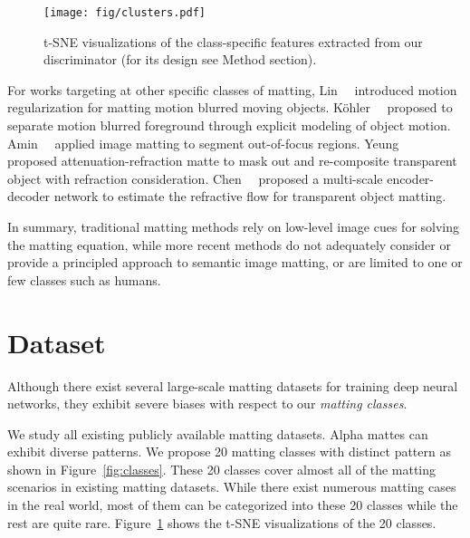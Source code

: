 \documentclass[10pt,twocolumn,letterpaper]{article}
\begin{document}
\begin{figure}[t]
\centering 
\texttt{[image: fig/clusters.pdf]} 
\caption{t-SNE visualizations of the class-specific features extracted from our discriminator (for its design see Method section).}
\label{fig:cluster}
\vspace{-12pt}
\end{figure}

\vspace{0.1in}

\vspace{2pt}
For works  targeting at other specific classes of matting, Lin~\etal~\cite{lin2011motion} introduced motion regularization for matting  motion blurred moving objects. Köhler~\etal~\cite{kohler2013improving} proposed to separate motion blurred foreground through explicit modeling of object motion. Amin~\etal~\cite{amin2019hybrid} applied image matting to segment out-of-focus regions. Yeung~\etal~\cite{yeung2011tog} proposed attenuation-refraction matte to mask out and re-composite transparent object with refraction consideration. Chen~\etal~\cite{chen2018tomnet} proposed a multi-scale encoder-decoder network to estimate the refractive flow for transparent object matting.


In summary, traditional matting methods rely on low-level image cues for solving the matting equation, while more recent methods do not adequately consider or provide a principled approach to semantic image matting, or are limited to one or few classes such as humans.


\section{Dataset}
Although there exist several large-scale matting datasets for training deep neural networks,  they exhibit severe biases with respect to our {\em matting classes}.


\vspace{4pt}
 We study all existing publicly available matting datasets. Alpha mattes can exhibit diverse patterns. We propose 20 matting classes with distinct pattern as shown in Figure~\ref{fig:classes}.
These 20 classes cover almost all of the matting scenarios  in existing matting datasets. While there exist numerous matting cases in the real world, most of them can be categorized into these 20 classes while the rest are quite rare.
Figure~\ref{fig:cluster} shows the t-SNE visualizations of the 20 classes. 
\end{document}
